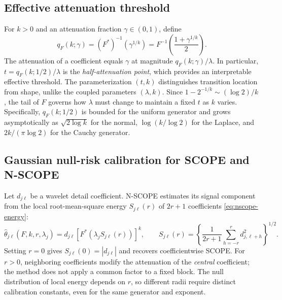 \documentclass[12pt]{article}
\theoremstyle{definition}
\theoremstyle{definition}
\begin{document}
\subsection{Effective attenuation threshold}
\label{sec:threshold}

For $k>0$ and an attenuation fraction $\gamma\in(0,1)$, define
\begin{equation}
q_F(k;\gamma)
  =(F^*)^{-1}(\gamma^{1/k})
  =F^{-1}\!\left(\frac{1+\gamma^{1/k}}{2}\right).
\label{eq:qF}
\end{equation}
The attenuation of a coefficient equals $\gamma$ at magnitude
$q_F(k;\gamma)/\lambda$. In particular,
$t=q_F(k;1/2)/\lambda$ is the \emph{half-attenuation point},
which provides an interpretable effective threshold. The
parameterization $(t,k)$ distinguishes transition location from
shape, unlike the coupled parameters $(\lambda,k)$. Since
$1-2^{-1/k}\sim(\log2)/k$, the tail of $F$ governs how $\lambda$
must change to maintain a fixed $t$ as $k$ varies. Specifically,
$q_F(k;1/2)$ is bounded for the uniform generator and grows
asymptotically as $\sqrt{2\log k}$ for the normal,
$\log(k/\log2)$ for the Laplace, and $2k/(\pi\log2)$ for
the Cauchy generator.

\subsection{Gaussian null-risk calibration for SCOPE and N-SCOPE}
\label{sec:nullrisk}

Let $d_{j\ell}$ be a wavelet detail coefficient. N-SCOPE estimates its
signal component from the local root-mean-square energy $S_{j\ell}(r)$
of $2r+1$ coefficients \eqref{eq:nscope-energy}:
\begin{equation}
\widehat\theta_{j\ell}(F,k,r,\lambda_j)
 = d_{j\ell}\left[F^*\!\left(\lambda_j S_{j\ell}(r)\right)\right]^k,
\qquad
S_{j\ell}(r)=\left\{\frac{1}{2r+1}
   \sum_{h=-r}^{r}d_{j,\ell+h}^2\right\}^{1/2}.
\label{eq:cal-nscope}
\end{equation}
Setting $r=0$ gives $S_{j\ell}(0)=|d_{j\ell}|$ and recovers
coefficientwise SCOPE. For $r>0$, neighboring coefficients modify
the attenuation of the \emph{central} coefficient; the method does
not apply a common factor to a fixed block. The null distribution
of local energy depends on $r$, so different radii require distinct
calibration constants, even for the same generator and exponent.
\end{document}
